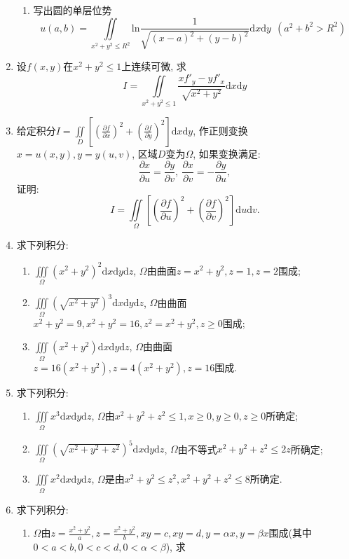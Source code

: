 \begin{enumerate}
\begin{enumerate}
	\item 写出圆的单层位势
	$$u(a,b)=\displaystyle{\underset{x^2+y^2\le R^2}{\iint}\mathrm{ln}\frac{1}{\sqrt{(x-a)^2+(y-b)^2}}\mathrm{d}x\mathrm{d}y}\ \ (a^2+b^2>R^2)$$
\end{enumerate}
\item 设$f(x,y)$在$x^2+y^2\le 1$上连续可微, 求
$$ I=\displaystyle{\underset{x^2+y^2\le 1}{\iint}\frac{xf'_y-yf'_x}{\sqrt{x^2+y^2}}\mathrm{d}x\mathrm{d}y}$$
\item 给定积分$I=\displaystyle{\underset{D}{\iint} [(\frac{\partial f}{\partial x})^2+(\frac{\partial f}{\partial y})^2]\mathrm{d}x\mathrm{d}y}$, 作正则变换$x=u(x,y),y=y(u,v)$, 区域$D$变为$\Omega$, 如果变换满足:
$$ \frac{\partial x}{\partial u}=\frac{\partial y}{\partial v},\ \frac{\partial x}{\partial v}=-\frac{\partial y}{\partial u},$$
证明:
$$ I = \displaystyle{\underset{\Omega}{\iint}[(\frac{\partial f}{\partial u})^2+(\frac{\partial f}{\partial v})^2]\mathrm{d}u\mathrm{d}v}.$$
\item 求下列积分:
\begin{enumerate}
	\item $\displaystyle{\underset{\Omega}{\iiint}(x^2+y^2)^2\mathrm{d}x\mathrm{d}y\mathrm{d}z}$, $\Omega$由曲面$z=x^2+y^2,z=1,z=2$围成;
	\item $\displaystyle{\underset{\Omega}{\iiint}(\sqrt{x^2+y^2})^3\mathrm{d}x\mathrm{d}y\mathrm{d}z}$, $\Omega$由曲面$x^2+y^2=9,x^2+y^2=16,z^2=x^2+y^2,z\ge 0$围成;
	\item $\displaystyle{\underset{\Omega}{\iiint}(x^2+y^2)\mathrm{d}x\mathrm{d}y\mathrm{d}z}$, $\Omega$由曲面$z=16(x^2+y^2), z=4(x^2+y^2), z=16$围成.
\end{enumerate}
\item 求下列积分:
\begin{enumerate}
	\item $\displaystyle{\underset{\Omega}{\iiint}x^3\mathrm{d}x\mathrm{d}y\mathrm{d}z}$, $\Omega$由$x^2+y^2+z^2\le 1,x\ge 0,y\ge 0,z\ge 0$所确定;
	\item $\displaystyle{\underset{\Omega}{\iiint}(\sqrt{x^2+y^2+z^2})^5\mathrm{d}x\mathrm{d}y\mathrm{d}z}$, $\Omega$由不等式$x^2+y^2+z^2\le 2z$所确定;
	\item $\displaystyle{\underset{\Omega}{\iiint}x^2\mathrm{d}x\mathrm{d}y\mathrm{d}z}$, $\Omega$是由$x^2+y^2\le z^2, x^2+y^2+z^2\le 8$所确定.
\end{enumerate}
\item 求下列积分:
\begin{enumerate}
	\item $\Omega$由$z=\frac{x^2+y^2}{a},z=\frac{x^2+y^2}{b},xy=c,xy=d,y=\alpha x,y=\beta x$围成(其中$0<a<b,0<c<d,0<\alpha<\beta$), 求

\end{enumerate}
\end{enumerate}
